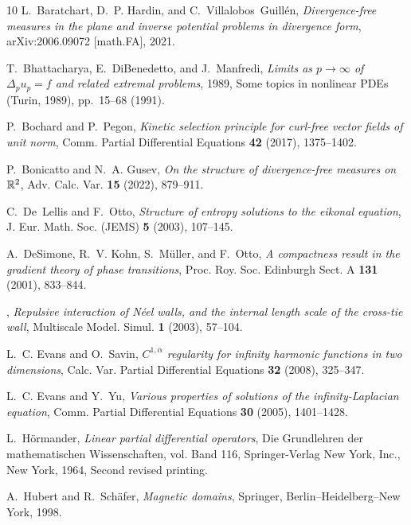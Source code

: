 \documentclass[a4paper]{article}
\theoremstyle{definition}
\theoremstyle{remark}
\begin{document}
\begin{thebibliography}{10}
L.~Baratchart, D.~P. Hardin, and C.~Villalobos~Guill\'en, \emph{Divergence-free
  measures in the plane and inverse potential problems in divergence form},
  arXiv:2006.09072 [math.FA], 2021.

T.~Bhattacharya, E.~DiBenedetto, and J.~Manfredi, \emph{Limits as
  {$p\to\infty$} of {$\Delta_pu_p=f$} and related extremal problems}, 1989,
  Some topics in nonlinear PDEs (Turin, 1989), pp.~15--68 (1991).

P.~Bochard and P.~Pegon, \emph{Kinetic selection principle for curl-free vector
  fields of unit norm}, Comm. Partial Differential Equations \textbf{42}
  (2017), 1375--1402.

P.~Bonicatto and N.~A. Gusev, \emph{On the structure of divergence-free
  measures on {$\Bbb{R}^2$}}, Adv. Calc. Var. \textbf{15} (2022), 879--911.

C.~De~Lellis and F.~Otto, \emph{Structure of entropy solutions to the eikonal
  equation}, J. Eur. Math. Soc. (JEMS) \textbf{5} (2003), 107--145.

A.~DeSimone, R.~V. Kohn, S.~M{\"u}ller, and F.~Otto, \emph{A compactness result
  in the gradient theory of phase transitions}, Proc. Roy. Soc. Edinburgh Sect.
  A \textbf{131} (2001), 833--844.

\bysame, \emph{Repulsive
  interaction of {N}\'eel walls, and the internal length scale of the cross-tie
  wall}, Multiscale Model. Simul. \textbf{1} (2003), 57--104.

L.~C. Evans and O.~Savin, \emph{{$C^{1,\alpha}$} regularity for infinity
  harmonic functions in two dimensions}, Calc. Var. Partial Differential
  Equations \textbf{32} (2008), 325--347.

L.~C. Evans and Y.~Yu, \emph{Various properties of solutions of the
  infinity-{L}aplacian equation}, Comm. Partial Differential Equations
  \textbf{30} (2005), 1401--1428.

L.~H\"ormander, \emph{Linear partial differential operators}, Die Grundlehren
  der mathematischen Wissenschaften, vol. Band 116, Springer-Verlag New York,
  Inc., New York, 1964, Second revised printing.

A.~Hubert and R.~Sch\"afer, \emph{Magnetic domains}, Springer,
  Berlin--Heidelberg--New York, 1998.


\end{thebibliography}
\end{document}
